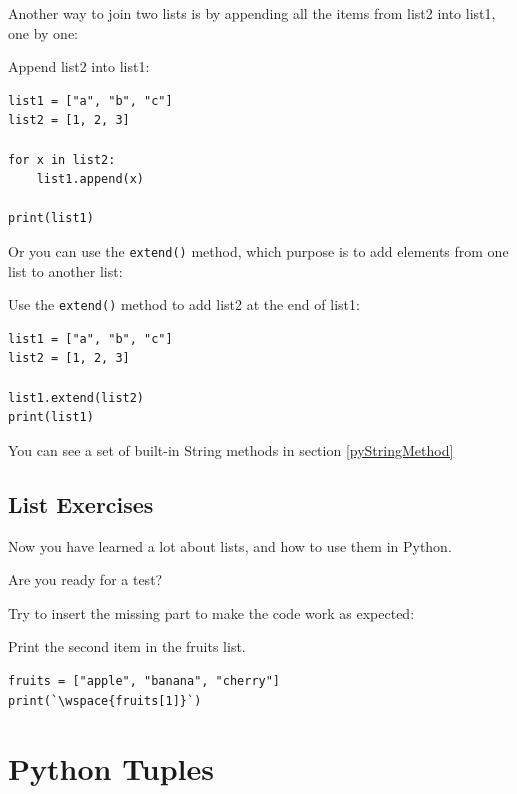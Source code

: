 \documentclass[12pt,a4paper]{article}
\newcommand{\wspace}[1]{%
	\color{white}\colorbox{white}{\texttt{#1}}%
}
\newcommand{\code}[1]{%
	\colorbox{backcolour}{\lstinline{#1}}%
}
\newcommand{\lcode}[1]{%
	\lstinline{#1}%
}
\begin{document}
Another way to join two lists is by appending all the items from list2 into list1, one by one:

\begin{ebox}
Append list2 into list1:
	\begin{lstlisting}
list1 = ["a", "b", "c"]
list2 = [1, 2, 3]

for x in list2:
    list1.append(x)

print(list1)
	\end{lstlisting}
\tcblower
	\begin{vercode}
['a', 'b', 'c', 1, 2, 3]
	\end{vercode}
\end{ebox}

Or you can use the \code{extend()} method, which purpose is to add elements
from one list to another list:

\begin{ebox}
	Use the \lcode{extend()} method to add list2 at the end of list1:
	\begin{lstlisting}
list1 = ["a", "b", "c"]
list2 = [1, 2, 3]

list1.extend(list2)
print(list1)
	\end{lstlisting}
\tcblower
	\begin{vercode}
['a', 'b', 'c', 1, 2, 3]
	\end{vercode}
\end{ebox}
You can see a set of built-in String methods in section \ref{pyStringMethod}
\subsection{List Exercises}

Now you have learned a lot about lists, and how to use them in Python.

Are you ready for a test?

Try to insert the missing part to make the code work as expected:

\begin{tbox}
	Print the second item in the fruits list.

	\begin{lstlisting}
fruits = ["apple", "banana", "cherry"]
print(`\wspace{fruits[1]}`)
	\end{lstlisting}
\end{tbox}
\vfill\newpage
\section{Python Tuples}\label{pyTuples}
\end{document}
